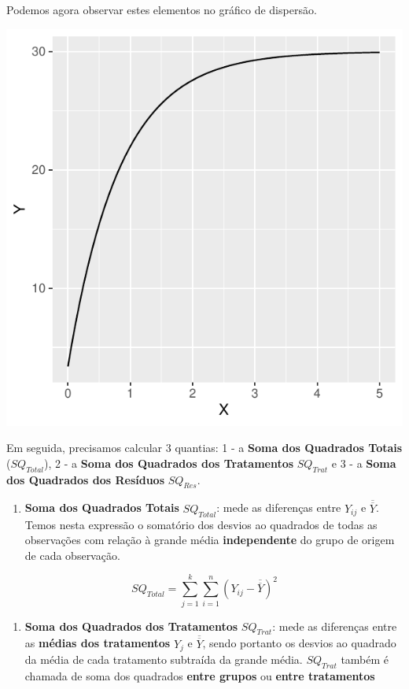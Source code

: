 \documentclass[
]{book}
\providecommand{\tightlist}{%
  \setlength{\itemsep}{0pt}\setlength{\parskip}{0pt}}
\begin{document}
Podemos agora observar estes elementos no gráfico de dispersão.

\includegraphics{probest-cambientais_files/figure-latex/unnamed-chunk-226-1.pdf}

Em seguida, precisamos calcular \(3\) quantias: 1 - a \textbf{Soma dos Quadrados Totais} (\(SQ_{Total}\)), 2 - a \textbf{Soma dos Quadrados dos Tratamentos} \(SQ_{Trat}\) e 3 - a \textbf{Soma dos Quadrados dos Resíduos} \(SQ_{Res}\).

\begin{enumerate}
\def\labelenumi{\arabic{enumi}.}
\tightlist
\item
  \textbf{Soma dos Quadrados Totais} \(SQ_{Total}\): mede as diferenças entre \(Y_{ij}\) e \(\overline{\overline{Y}}\). Temos nesta expressão o somatório dos desvios ao quadrados de todas as observações com relação à grande média \textbf{independente} do grupo de origem de cada observação.
\end{enumerate}

\[SQ_{Total} = \sum_{j = 1}^{k}\sum_{i = 1}^{n}(Y_{ij} - \overline{\overline{Y}})^2\]

\begin{enumerate}
\def\labelenumi{\arabic{enumi}.}
\setcounter{enumi}{1}
\tightlist
\item
  \textbf{Soma dos Quadrados dos Tratamentos} \(SQ_{Trat}\): mede as diferenças entre as \textbf{médias dos tratamentos} \(Y_j\) e \(\overline{\overline{Y}}\), sendo portanto os desvios ao quadrado da média de cada tratamento subtraída da grande média. \(SQ_{Trat}\) também é chamada de soma dos quadrados \textbf{entre grupos} ou \textbf{entre tratamentos}
\end{enumerate}
\end{document}
